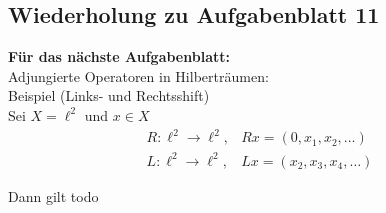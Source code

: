 \subsection*{Wiederholung zu Aufgabenblatt 11}

\textbf{Für das nächste Aufgabenblatt:} \\
Adjungierte Operatoren in Hilberträumen: \\

Beispiel (Links- und Rechtsshift) \\
Sei $X = \ell^{2}$ und $x \in X$
\begin{align*}
	R \colon \ell^{2} \rightarrow \ell^{2}, & R x = ( 0 , x_{1} , x_{2}, \dotsc) \\
	L \colon \ell^{2} \rightarrow \ell^{2}, & L x = ( x_{2}, x_{3}, x_{4}, \dotsc)
\end{align*}

Dann gilt todo %


\newpage